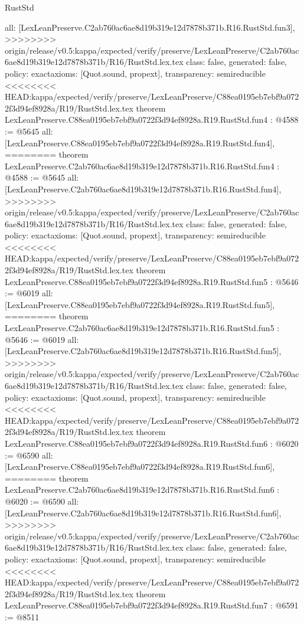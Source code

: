 \begin{lexlean}{RustStd}
\begin{coremodule}
{\begin{coremodule}
{{{{{{{  all: [LexLeanPreserve.C2ab760ac6ae8d19b319e12d7878b371b.R16.RustStd.fun3],
>>>>>>>> origin/release/v0.5:kappa/expected/verify/preserve/LexLeanPreserve/C2ab760ac6ae8d19b319e12d7878b371b/R16/RustStd.lex.tex
  class: false,
  generated: false,
  policy: exact{axioms: [Quot.sound, propext]},
  transparency: semireducible
}
<<<<<<<< HEAD:kappa/expected/verify/preserve/LexLeanPreserve/C88ea0195eb7ebf9a0722f3d94ef8928a/R19/RustStd.lex.tex
theorem LexLeanPreserve.C88ea0195eb7ebf9a0722f3d94ef8928a.R19.RustStd.fun4 : @4588 := @5645 {
  all: [LexLeanPreserve.C88ea0195eb7ebf9a0722f3d94ef8928a.R19.RustStd.fun4],
========
theorem LexLeanPreserve.C2ab760ac6ae8d19b319e12d7878b371b.R16.RustStd.fun4 : @4588 := @5645 {
  all: [LexLeanPreserve.C2ab760ac6ae8d19b319e12d7878b371b.R16.RustStd.fun4],
>>>>>>>> origin/release/v0.5:kappa/expected/verify/preserve/LexLeanPreserve/C2ab760ac6ae8d19b319e12d7878b371b/R16/RustStd.lex.tex
  class: false,
  generated: false,
  policy: exact{axioms: [Quot.sound, propext]},
  transparency: semireducible
}
<<<<<<<< HEAD:kappa/expected/verify/preserve/LexLeanPreserve/C88ea0195eb7ebf9a0722f3d94ef8928a/R19/RustStd.lex.tex
theorem LexLeanPreserve.C88ea0195eb7ebf9a0722f3d94ef8928a.R19.RustStd.fun5 : @5646 := @6019 {
  all: [LexLeanPreserve.C88ea0195eb7ebf9a0722f3d94ef8928a.R19.RustStd.fun5],
========
theorem LexLeanPreserve.C2ab760ac6ae8d19b319e12d7878b371b.R16.RustStd.fun5 : @5646 := @6019 {
  all: [LexLeanPreserve.C2ab760ac6ae8d19b319e12d7878b371b.R16.RustStd.fun5],
>>>>>>>> origin/release/v0.5:kappa/expected/verify/preserve/LexLeanPreserve/C2ab760ac6ae8d19b319e12d7878b371b/R16/RustStd.lex.tex
  class: false,
  generated: false,
  policy: exact{axioms: [Quot.sound, propext]},
  transparency: semireducible
}
<<<<<<<< HEAD:kappa/expected/verify/preserve/LexLeanPreserve/C88ea0195eb7ebf9a0722f3d94ef8928a/R19/RustStd.lex.tex
theorem LexLeanPreserve.C88ea0195eb7ebf9a0722f3d94ef8928a.R19.RustStd.fun6 : @6020 := @6590 {
  all: [LexLeanPreserve.C88ea0195eb7ebf9a0722f3d94ef8928a.R19.RustStd.fun6],
========
theorem LexLeanPreserve.C2ab760ac6ae8d19b319e12d7878b371b.R16.RustStd.fun6 : @6020 := @6590 {
  all: [LexLeanPreserve.C2ab760ac6ae8d19b319e12d7878b371b.R16.RustStd.fun6],
>>>>>>>> origin/release/v0.5:kappa/expected/verify/preserve/LexLeanPreserve/C2ab760ac6ae8d19b319e12d7878b371b/R16/RustStd.lex.tex
  class: false,
  generated: false,
  policy: exact{axioms: [Quot.sound, propext]},
  transparency: semireducible
}
<<<<<<<< HEAD:kappa/expected/verify/preserve/LexLeanPreserve/C88ea0195eb7ebf9a0722f3d94ef8928a/R19/RustStd.lex.tex
theorem LexLeanPreserve.C88ea0195eb7ebf9a0722f3d94ef8928a.R19.RustStd.fun7 : @6591 := @8511 {
}}}}}}}}}}
\end{coremodule}}
\end{coremodule}
\end{lexlean}
